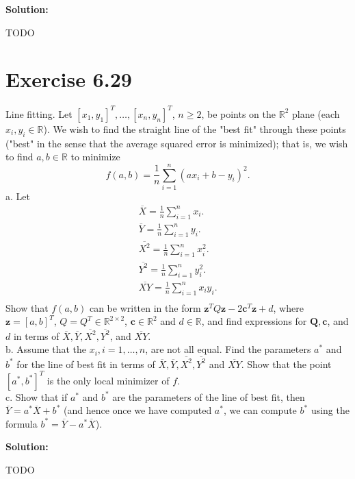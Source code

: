 \documentclass{article}
\newcommand{\bld}[1]{\boldsymbol{#1}}
\begin{document}
\textbf{Solution:}

TODO
\section*{Exercise 6.29}
Line fitting. Let $[x_1,y_1]^T,\dots,[x_n,y_n]^T$, $n\geq 2$, be points on the
$\mathbb{R}^2$ plane (each $x_i,y_i\in \mathbb{R}$). We wish to find the
straight line of the "best fit" through these points ("best" in the sense that
the average squared error is minimized); that is, we wish to find $a,b\in
\mathbb{R}$ to minimize
\[
	f(a,b)=\frac{1}{n} \sum_{i=1}^n(ax_i+b-y_i)^2.
\]
a. Let
\begin{align*}
	\overline{X}=\frac{1}{n}\sum_{i=1}^n x_i.\\
	\overline{Y}=\frac{1}{n}\sum_{i=1}^n y_i.\\
	\overline{X^2}=\frac{1}{n}\sum_{i=1}^n x_i^2.\\
	\overline{Y^2}=\frac{1}{n}\sum_{i=1}^n y_i^2.\\
	\overline{XY}=\frac{1}{n}\sum_{i=1}^n x_iy_i.\\
\end{align*}
Show that $f(a,b)$ can be written in the form $\bld{z}^TQ\bld{z} -
2\bld{c}^T\bld{z} + d$, where $\bld{z}=[a,b]^T$, $Q=Q^T\in \mathbb{R}^{2\times
2}$, $\bld{c}\in \mathbb{R}^2$ and $d\in\mathbb{R}$, and find expressions for
$\bld{Q},\bld{c}$, and $d$ in terms of $\overline{X}, \overline{Y},
\overline{X^2}, \overline{Y^2}$, and $\overline{XY}$.\\
b. Assume that the $x_i, i=1,\dots,n$, are not all equal. Find the parameters
$a^*$ and $b^*$ for the line of best fit in terms of
$\overline{X},\overline{Y},\overline{X^2},\overline{Y^2}$ and $\overline{XY}$.
Show that the point $[a^*,b^*]^T$ is the only local minimizer of $f$.\\
c. Show that if $a^*$ and $b^*$ are the parameters of the line of best fit,
then $\overline{Y}=a^*\overline{X}+b^*$ (and hence once we have computed $a^*$,
we can compute $b^*$ using the formula $b^*=\overline{Y}-a^*\overline{X}$).

\textbf{Solution:}

TODO
\end{document}
